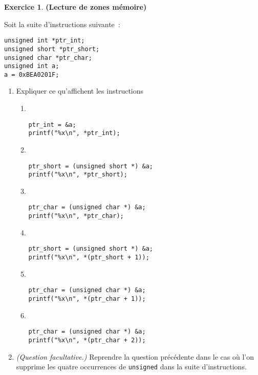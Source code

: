 \documentclass[12pt]{article}
\theoremstyle{definition}
\newtheorem{Exercice}{Exercice}
\begin{document}
\begin{Exercice} {\bf (Lecture de zones mémoire)}\smallskip

Soit la suite d'instructions suivante~:
\begin{lstlisting}
unsigned int *ptr_int;
unsigned short *ptr_short;
unsigned char *ptr_char;
unsigned int a;
a = 0xBEA0201F;
\end{lstlisting}
\begin{enumerate}
    \item Expliquer ce qu'affichent les instructions
    \begin{multicols}{2}
    \begin{enumerate}
        \item ~
\begin{lstlisting}
ptr_int = &a;
printf("%x\n", *ptr_int);
\end{lstlisting}
    \smallskip

    \item ~
\begin{lstlisting}
ptr_short = (unsigned short *) &a;
printf("%x\n", *ptr_short);
\end{lstlisting}
    \smallskip

    \item ~
\begin{lstlisting}
ptr_char = (unsigned char *) &a;
printf("%x\n", *ptr_char);
\end{lstlisting}
    \smallskip

    \item ~
\begin{lstlisting}
ptr_short = (unsigned short *) &a;
printf("%x\n", *(ptr_short + 1));
\end{lstlisting}
    \smallskip

    \item ~
\begin{lstlisting}
ptr_char = (unsigned char *) &a;
printf("%x\n", *(ptr_char + 1));
\end{lstlisting}
    \smallskip

    \item ~
\begin{lstlisting}
ptr_char = (unsigned char *) &a;
printf("%x\n", *(ptr_char + 2));
\end{lstlisting}
    \end{enumerate}
    \end{multicols}

    \item {\em (Question facultative.)} Reprendre la question
    précédente dans le cas où l'on supprime les quatre occurrences
    de {\tt unsigned} dans la suite d'instructions.
\end{enumerate}
\end{Exercice}
\bigskip
\end{document}
